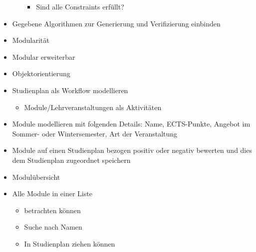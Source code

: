 \begin{itemize}[nosep]
\begin{itemize}[nosep]
\begin{itemize}[nosep]
			\item Sind alle Constraints erfüllt?
		\end{itemize}
	\end{itemize}
	\item Gegebene Algorithmen zur Generierung und Verifizierung einbinden
	\item Modularität
	\item Modular erweiterbar
	\item Objektorientierung
	\item Studienplan als Workflow modellieren
	\begin{itemize}[nosep]
		\item Module/Lehrveranstaltungen als Aktivitäten
	\end{itemize}
	\item Module modellieren mit folgenden Details: Name, ECTS-Punkte, Angebot im Sommer- oder Wintersemester, Art der Veranstaltung
	\item Module auf einen Studienplan bezogen positiv oder negativ bewerten und dies dem Studienplan zugeordnet speichern
	\item Modulübersicht
		\item Alle Module in einer Liste
			\begin{itemize}[nosep]
				\item betrachten können
				\item Suche nach Namen
				\item In Studienplan ziehen können
			\end{itemize}
\end{itemize}


